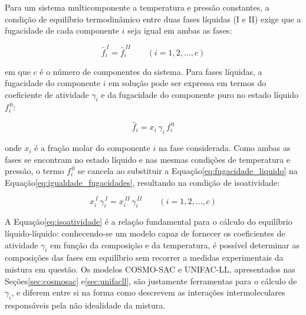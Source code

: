 
Para um sistema multicomponente a temperatura e pressão constantes, a condição de equilíbrio termodinâmico entre duas fases líquidas (I e II) exige que a fugacidade de cada componente $i$ seja igual em ambas as fases\cite{smith2005}:

\begin{equation}
    \hat{f}_i^{\,I} = \hat{f}_i^{\,II}
    \qquad (i = 1, 2, \ldots, c)
    \label{eq:igualdade_fugacidades}
\end{equation}

\noindent em que $c$ é o número de componentes do sistema. Para fases líquidas, a fugacidade do componente $i$ em solução pode ser expressa em termos do coeficiente de atividade $\gamma_i$ e da fugacidade do componente puro no estado líquido $f_i^{\,0}$:

\begin{equation}
    \hat{f}_i = x_i \, \gamma_i \, f_i^{\,0}
    \label{eq:fugacidade_liquido}
\end{equation}

\noindent onde $x_i$ é a fração molar do componente $i$ na fase considerada. Como ambas as fases se encontram no estado líquido e nas mesmas condições de temperatura e pressão, o termo $f_i^{\,0}$ se cancela ao substituir a Equação\ref{eq:fugacidade_liquido} na Equação\ref{eq:igualdade_fugacidades}, resultando na condição de isoatividade:

\begin{equation}
    x_i^{\,I} \, \gamma_i^{\,I} = x_i^{\,II} \, \gamma_i^{\,II}
    \qquad (i = 1, 2, \ldots, c)
    \label{eq:isoatividade}
\end{equation}

A Equação\ref{eq:isoatividade} é a relação fundamental para o cálculo do equilíbrio líquido-líquido: conhecendo-se um modelo capaz de fornecer os coeficientes de atividade $\gamma_i$ em função da composição e da temperatura, é possível determinar as composições das fases em equilíbrio sem recorrer a medidas experimentais da mistura em questão. Os modelos COSMO-SAC e UNIFAC-LL, apresentados nas Seções\ref{sec:cosmosac} e\ref{sec:unifacll}, são justamente ferramentas para o cálculo de $\gamma_i$, e diferem entre si na forma como descrevem as interações intermoleculares responsáveis pela não idealidade da mistura.

